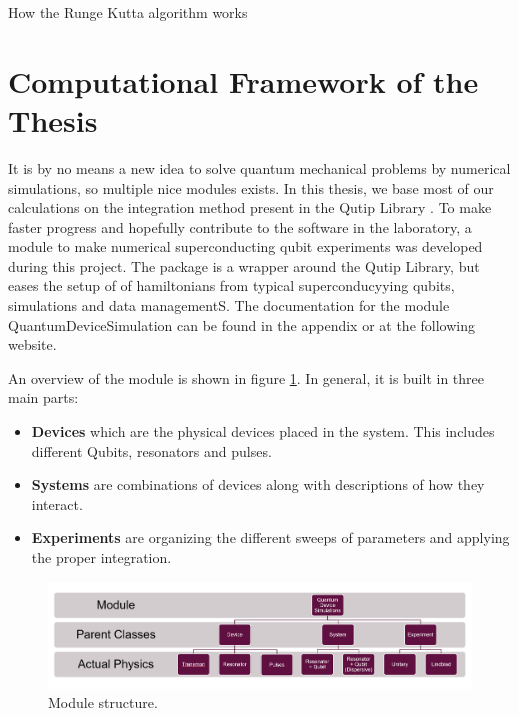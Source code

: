 \begin{marginfigure}
    \centering
    \caption{How the Runge Kutta algorithm works}
    \label{fig:Runge-Kutta}
\end{marginfigure}




\section{Computational Framework of the Thesis}
It is by no means a new idea to solve quantum mechanical problems by numerical simulations, so multiple nice modules exists. In this thesis, we base most of our calculations on the integration method present in the Qutip Library . To make faster progress and hopefully contribute to the software in the laboratory, a module to make numerical superconducting qubit experiments was developed during this project. The package is a wrapper around the Qutip Library, but eases the setup of of hamiltonians from typical superconducyying qubits, simulations and data managementS. The documentation for the module QuantumDeviceSimulation can be found in the appendix or at the following website. 

An overview of the module is shown in figure \ref{fig:module_overview}. In general, it is built in three main parts:
\begin{itemize}
    \item \textbf{Devices} which are the physical devices placed in the system. This includes different Qubits, resonators and pulses.
    \item \textbf{Systems} are combinations of devices along with descriptions of how they interact.
    \item \textbf{Experiments} are organizing the different sweeps of parameters and applying the proper integration. 
\end{itemize}

\begin{figure}
    \centering
    \includegraphics{Figs/Sections/Introduction/module.png}
    \caption{Module structure.}
    \label{fig:module_overview}
\end{figure}
